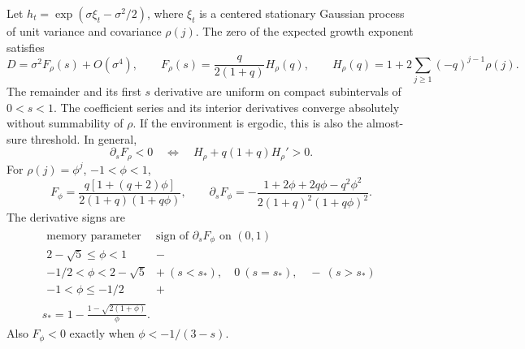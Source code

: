 \begin{proposition}
\label{prop:exact-mem-coefficient}
Let $h_t=\exp(\sigma\xi_t-\sigma^2/2)$, where $\xi_t$ is a centered
stationary Gaussian process of unit variance and covariance $\rho(j)$.
The zero of the expected growth exponent satisfies
\begin{equation}
 D=\sigma^2 F_\rho(s)+O(\sigma^4),\qquad
 F_\rho(s)=\frac{q}{2(1+q)}H_\rho(q),\qquad
 H_\rho(q)=1+2\sum_{j\geq1}(-q)^{j-1}\rho(j).
 \label{eq:exact-mem-gaussian}
\end{equation}
The remainder and its first $s$ derivative are uniform on compact
subintervals of $0<s<1$. The coefficient series and its interior
derivatives converge absolutely without summability of $\rho$.
If the environment is ergodic, this is also the almost-sure threshold.
In general,
\begin{equation}
 \partial_sF_\rho<0
 \quad\Longleftrightarrow\quad H_\rho+q(1+q)H_\rho'>0.
 \label{eq:exact-mem-sign}
\end{equation}
For $\rho(j)=\phi^j$, $-1<\phi<1$,
\begin{equation}
 F_\phi=\frac{q[1+(q+2)\phi]}{2(1+q)(1+q\phi)},\qquad
 \partial_sF_\phi=-\frac{1+2\phi+2q\phi-q^2\phi^2}
 {2(1+q)^2(1+q\phi)^2}.
 \label{eq:exact-mem-ar}
\end{equation}
The derivative signs are
\begin{equation}
\begin{gathered}
\begin{array}{c|c}
 \text{memory parameter}&\text{sign of }\partial_sF_\phi\text{ on }(0,1)\\ \hline
 2-\sqrt5\leq\phi<1& -\\
 -1/2<\phi<2-\sqrt5& +\ (s<s_*),\quad 0\ (s=s_*),\quad -\ (s>s_*)\\
 -1<\phi\leq-1/2& +
\end{array}\\
s_*=1-\frac{1-\sqrt{2(1+\phi)}}{\phi}.
\end{gathered}
 \label{eq:exact-mem-sign-table}
\end{equation}
Also $F_\phi<0$ exactly when $\phi<-1/(3-s)$.
\end{proposition}

